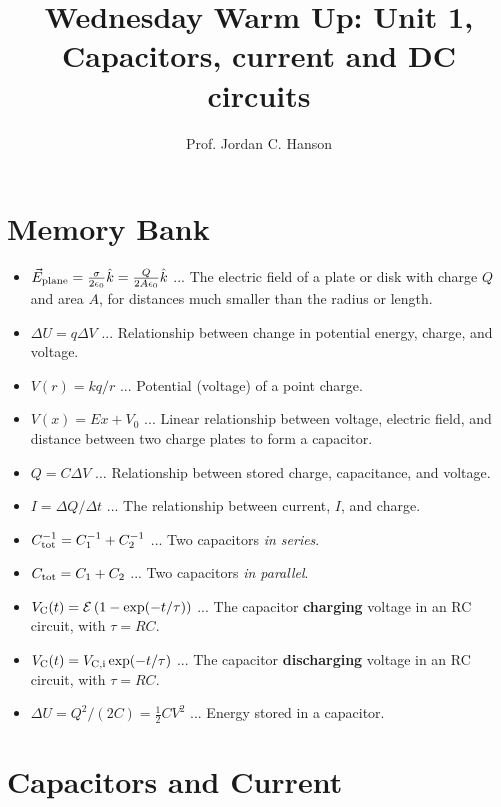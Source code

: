 \documentclass{article}
\begin{document}
\twocolumn

\title{Wednesday Warm Up: Unit 1, Capacitors, current and DC circuits}
\author{Prof. Jordan C. Hanson}

\maketitle

\section{Memory Bank}

\begin{itemize}
\item $\vec{E}_{\rm plane} = \frac{\sigma}{2\epsilon_0}\hat{k} = \frac{Q}{2A\epsilon_0}\hat{k}$ ... The electric field of a plate or disk with charge $Q$ and area $A$, for distances much smaller than the radius or length.
\item $\Delta U = q\Delta V$ ... Relationship between change in potential energy, charge, and voltage.
\item $V(r) = k q / r$ ... Potential (voltage) of a point charge.
\item $V(x) = E x + V_0$ ... Linear relationship between voltage, electric field, and distance between two charge plates to form a capacitor.
\item $Q = C\Delta V$ ... Relationship between stored charge, capacitance, and voltage.
\item $I = \Delta Q / \Delta t$ ... The relationship between current, $I$, and charge.
\item $C_{\rm tot}^{-1} = C_1^{-1} + C_2^{-1}$ ... Two capacitors \textit{in series}.
\item $C_{\rm tot} = C_1 + C_2$ ... Two capacitors \textit{in parallel}.
\item $V_{\rm C}(t) = \mathcal{E}\left(1 - \exp(-t/\tau)\right)$ ... The capacitor \textbf{charging} voltage in an RC circuit, with $\tau = RC$.
\item $V_{\rm C}(t) = V_{\rm C,i}\exp(-t/\tau)$ ... The capacitor \textbf{discharging} voltage in an RC circuit, with $\tau = RC$.
\item $\Delta U = Q^2/(2C) = \frac{1}{2}CV^2$ ... Energy stored in a capacitor.
\end{itemize}

\section{Capacitors and Current}
\end{document}
